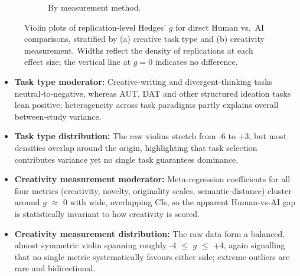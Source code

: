 \documentclass[manuscript, screen, review, acmsmall, anonymous]{acmart}
\begin{document}
\begin{figure}[H]
\begin{subfigure}[t]{0.49\linewidth}
    \caption{By measurement method.}
    \label{fig:versus_raw_violin_measurement}
  \end{subfigure}
  \caption{Violin plots of replication-level Hedges’ $g$ for direct Human vs.\ AI comparisons, stratified by (a) creative task type and (b) creativity measurement. Widths reflect the density of replications at each effect size; the vertical line at $g=0$ indicates no difference.}
  \label{fig:versus_raw_violins_task_measure}
\end{figure}
\begin{itemize}
  \item \textbf{Task type moderator:} Creative‑writing and divergent‑thinking tasks neutral‑to‑negative, whereas AUT, DAT and other structured ideation tasks lean positive; heterogeneity across task paradigms partly explains overall between‑study variance.
  \item \textbf{Task type distribution:} The raw violins stretch from -6 to +3, but most densities overlap around the origin, highlighting that task selection contributes variance yet no single task guarantees dominance.
  \item \textbf{Creativity measurement moderator:} Meta‑regression coefficients for all four metrics (creativity, novelty, originality scales, semantic‑distance) cluster around $g$ $\approx$ 0 with wide, overlapping CIs, so the apparent Human‑vs‑AI gap is statistically invariant to how creativity is scored.
  \item \textbf{Creativity measurement distribution:} The raw data form a balanced, almost symmetric violin spanning roughly -4 $\le$ $g$ $\le$ +4, again signalling that no single metric systematically favours either side; extreme outliers are rare and bidirectional.
\end{itemize}
\end{document}
